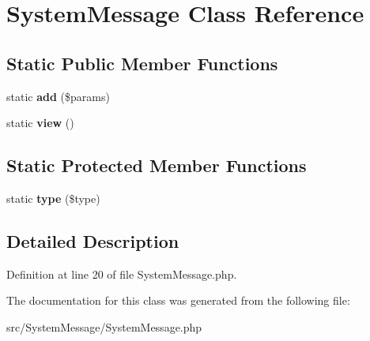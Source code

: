 \hypertarget{class_zest_1_1_system_message_1_1_system_message}{}\section{System\+Message Class Reference}
\label{class_zest_1_1_system_message_1_1_system_message}
\subsection*{Static Public Member Functions}
\begin{DoxyCompactItemize}
\item 
\mbox{\label{class_zest_1_1_system_message_1_1_system_message_a1e6bff7f263bb87c09373946275a8a20}} 
static {\bfseries add} (\$params)
\item 
\mbox{\label{class_zest_1_1_system_message_1_1_system_message_abe0ba32ea3d9463b1cbb84bb32a2ee17}} 
static {\bfseries view} ()
\end{DoxyCompactItemize}
\subsection*{Static Protected Member Functions}
\begin{DoxyCompactItemize}
\item 
\mbox{\label{class_zest_1_1_system_message_1_1_system_message_ab1d400a505a0a37507d931b8feba7804}} 
static {\bfseries type} (\$type)
\end{DoxyCompactItemize}


\subsection{Detailed Description}


Definition at line 20 of file System\+Message.\+php.



The documentation for this class was generated from the following file\+:\begin{DoxyCompactItemize}
\item 
src/\+System\+Message/System\+Message.\+php\end{DoxyCompactItemize}
